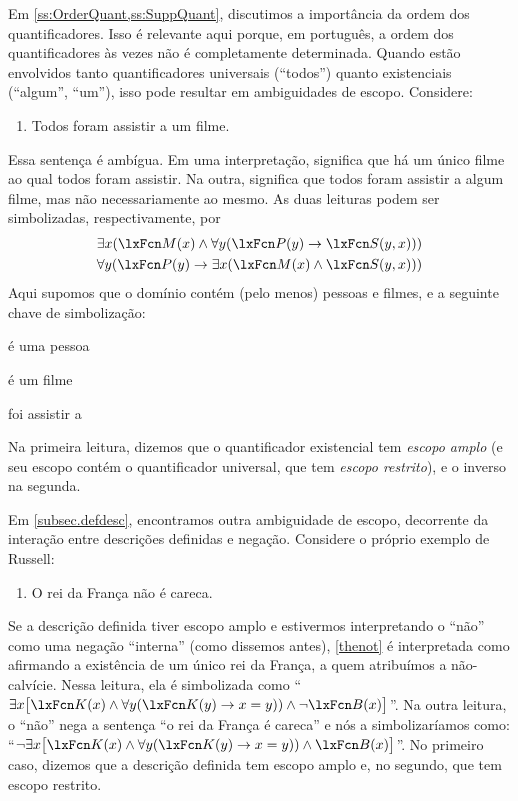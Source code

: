 Em \cref{ss:OrderQuant,ss:SuppQuant}, discutimos a importância da ordem dos quantificadores. Isso é relevante aqui porque, em português, a ordem dos quantificadores às vezes não é completamente determinada. Quando estão envolvidos tanto quantificadores universais (\textquotedblleft todos\textquotedblright{}) quanto existenciais (\textquotedblleft algum\textquotedblright{}, \textquotedblleft um\textquotedblright{}), isso pode resultar em ambiguidades de escopo. Considere:
\begin{enumerate}
\item\label{everya} Todos foram assistir a um filme.
\end{enumerate}
Essa sentença é ambígua. Em uma interpretação, significa que há um único filme ao qual todos foram assistir. Na outra, significa que todos foram assistir a algum filme, mas não necessariamente ao mesmo. As duas leituras podem ser simbolizadas, respectivamente, por
\begin{align*}
	& \exists x(\atom{M}{x} \eand \forall y(\atom{P}{y} \eif \atom{S}{y,x}))\\
	& \forall y(\atom{P}{y} \eif \exists x(\atom{M}{x} \eand \atom{S}{y,x}))
\end{align*}
Aqui supomos que o domínio contém (pelo menos) pessoas e filmes,
e a seguinte chave de simbolização:
\begin{ekey}
\item[\atom{P}{y}]  é uma pessoa
\item[\atom{M}{x}]  é um filme
\item[\atom{S}{y,x}]  foi assistir a 
\end{ekey}
Na primeira leitura, dizemos que o quantificador existencial tem \emph{escopo amplo} (e seu escopo contém o quantificador universal, que tem \emph{escopo restrito}), e o inverso na segunda.

Em \cref{subsec.defdesc}, encontramos outra ambiguidade de escopo, decorrente da interação entre descrições definidas e negação. Considere o próprio exemplo de Russell:
\begin{enumerate}
\item\label{thenot} O rei da França não é careca.
\end{enumerate}
Se a descrição definida tiver escopo amplo e estivermos interpretando o \textquotedblleft não\textquotedblright{} como uma negação \textquotedblleft interna\textquotedblright{} (como dissemos antes), \cref*{thenot} é interpretada como afirmando a existência de um único rei da França, a quem atribuímos a não-calvície. Nessa leitura, ela é simbolizada como \textquotedblleft $\exists x\bigl[\atom{K}{x} \eand \forall y(\atom{K}{y} \eif x=y)) \eand \enot \atom{B}{x}\bigr]$\textquotedblright{}. Na outra leitura, o \textquotedblleft não\textquotedblright{} nega a sentença \textquotedblleft o rei da França é careca\textquotedblright{} e nós a simbolizaríamos como: \textquotedblleft $\enot\exists x\bigl[\atom{K}{x} \eand \forall y(\atom{K}{y} \eif x=y)) \eand \atom{B}{x}\bigr]$\textquotedblright{}. No primeiro caso, dizemos que a descrição definida tem escopo amplo e, no segundo, que tem escopo restrito.

